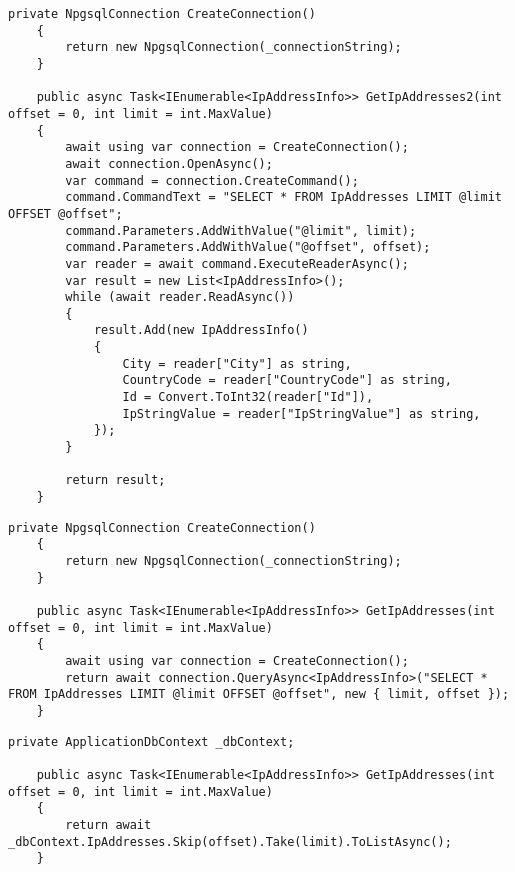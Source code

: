 \begin{lstlisting}[float,language={[Sharp]C},caption={Ukážka kódu pre ten istý dopyt pomocou rôznych knižníc - ADO.NET},label=alg:Ukazka_ADO]
    private NpgsqlConnection CreateConnection()
    {
        return new NpgsqlConnection(_connectionString);
    }

    public async Task<IEnumerable<IpAddressInfo>> GetIpAddresses2(int offset = 0, int limit = int.MaxValue)
    {
        await using var connection = CreateConnection();
        await connection.OpenAsync();
        var command = connection.CreateCommand();
        command.CommandText = "SELECT * FROM IpAddresses LIMIT @limit OFFSET @offset";
        command.Parameters.AddWithValue("@limit", limit);
        command.Parameters.AddWithValue("@offset", offset);
        var reader = await command.ExecuteReaderAsync();
        var result = new List<IpAddressInfo>();
        while (await reader.ReadAsync())
        {
            result.Add(new IpAddressInfo()
            {
                City = reader["City"] as string,
                CountryCode = reader["CountryCode"] as string,
                Id = Convert.ToInt32(reader["Id"]),
                IpStringValue = reader["IpStringValue"] as string,
            });
        }

        return result;
    }
\end{lstlisting}
\begin{lstlisting}[float,language={[Sharp]C},caption={Ukážka kódu pre ten istý dopyt pomocou rôznych knižníc - Dapper},label=alg:Ukazka_Dapper]
    private NpgsqlConnection CreateConnection()
    {
        return new NpgsqlConnection(_connectionString);
    }

    public async Task<IEnumerable<IpAddressInfo>> GetIpAddresses(int offset = 0, int limit = int.MaxValue)
    {
        await using var connection = CreateConnection();
        return await connection.QueryAsync<IpAddressInfo>("SELECT * FROM IpAddresses LIMIT @limit OFFSET @offset", new { limit, offset });
    }
\end{lstlisting}
\begin{lstlisting}[float,language={[Sharp]C},caption={Ukážka kódu pre ten istý dopyt pomocou rôznych knižníc - EFC},label=alg:Ukazka_EFC]
    private ApplicationDbContext _dbContext;

    public async Task<IEnumerable<IpAddressInfo>> GetIpAddresses(int offset = 0, int limit = int.MaxValue)
    {
        return await _dbContext.IpAddresses.Skip(offset).Take(limit).ToListAsync();
    }
\end{lstlisting}

